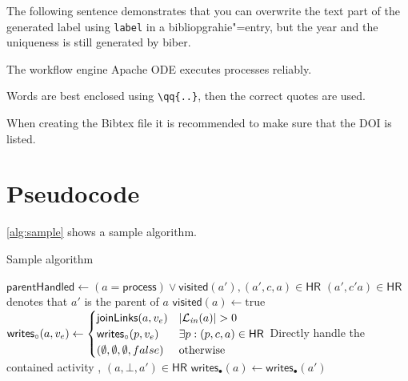 The following sentence demonstrates that you can overwrite the text part of the generated label using \texttt{label} in a bibliopgrahie"=entry, but the year and the uniqueness is still generated by biber.

\begin{filecontents*}{\democodefile}
The workflow engine Apache ODE \cite{ApacheODE} executes \BPEL processes reliably.
\end{filecontents*}

\begin{filecontents*}{\democodefile}
Words are best enclosed using \texttt{\textbackslash qq\{..\}}, then the correct quotes are used.
\end{filecontents*}

When creating the Bibtex file it is recommended to make sure that the DOI is listed.





\section{Pseudocode}
\autoref{alg:sample} shows a sample algorithm.
\begin{Algorithmus} %
  \caption{Sample algorithm}
  \label{alg:sample}
  \begin{algorithmic}
\State $\mathsf{parentHandled} \gets (a = \mathsf{process}) \lor \mathsf{visited}(a'), (a',c,a) \in \mathsf{HR}$
\State \Comment $(a',c'a) \in \mathsf{HR}$ denotes that $a'$ is the parent of $a$
\State $\mathsf{visited}(a) \gets \text{true}$
\State $\mathsf{writes}_\circ(a,v_e) \gets
\begin{cases}
\mathsf{joinLinks}(a,v_e) & \left\lvert\mathcal{L}_\mathit{in}(a)\right\rvert > 0\\
\mathsf{writes}_\circ(p,v_e)
& \exists p: (p,c,a) \in \mathsf{HR}\\
(\emptyset, \emptyset, \emptyset, false) & \text{otherwise}
\end{cases}
$
  \State {}
  \State {}
 \Comment Directly handle the contained activity
  \State {}, $(a,\bot,a') \in \mathsf{HR}$
  \State $\mathsf{writes}_\bullet(a) \gets \mathsf{writes}_\bullet(a')$
\EndIf
{}
  \State {}
\EndFor
\EndIf
\EndProcedure
  \end{algorithmic}
\end{Algorithmus}

